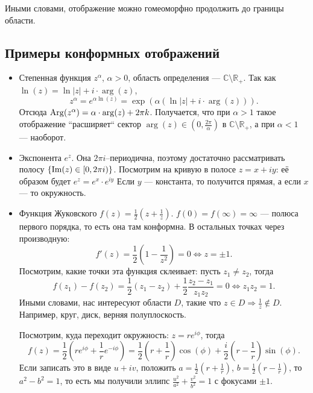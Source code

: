 Иными словами, отображение можно гомеоморфно продолжить до границы области.
\subsection{Примеры конформных отображений}
\begin{itemize}
    \item Степенная функция $z^{\alpha}$, $\alpha > 0$, область определения --- $\mathbb C \setminus \mathbb R_+$.
        Так как $\ln(z) = \ln|z| + i \cdot \arg(z)$,
        \[
            z^\alpha = e^{\alpha \ln(z)} = \exp(\alpha(\ln|z| + i \cdot \arg(z))).
        \]
        Отсюда $\operatorname{Arg}(z^\alpha) = \alpha \cdot \arg(z) + 2\pi k$.
        Получается, что при $\alpha > 1$ такое отображение ``расширяет`` сектор $\arg(z) \in (0, \frac{2\pi}{\alpha})$ в $\mathbb C \setminus \mathbb R_+$, а при $\alpha < 1$ --- наоборот.

    \item Экспонента $e^z$.
        Она $2\pi i$--периодична, поэтому достаточно рассматривать полосу $\{\operatorname{Im}(z) \in [0, 2\pi i)\}$.
        Посмотрим на кривую в полосе $z = x + iy$: её образом будет $e^z = e^x \cdot e^{iy}$
        Если $y$ --- константа, то получится прямая, а если $x$ --- то окружность.

    \item Функция Жуковского $f(z) = \frac{1}{2} \left(z + \frac{1}{z} \right)$.
        $f(0) = f(\infty) = \infty$ --- полюса первого порядка, то есть она там конформна.
        В остальных точках через производную:
        \[
            f'(z) = \frac{1}{2} \left(1 - \frac{1}{z^2} \right) = 0 \iff z = \pm 1.
        \]
        Посмотрим, какие точки эта функция склеивает: пусть $z_1 \ne z_2$, тогда
        \[
            f(z_1) - f(z_2) = \frac{1}{2}(z_1 - z_2) + \frac{1}{2} \frac{z_2 - z_1}{z_1 z_2} = 0 \iff z_1 z_2 = 1.
        \]
        Иными словами, нас интересуют области $D$, такие что $z \in D \Rightarrow \frac{1}{z} \not\in D$.
        Например, круг, диск, верняя полуплоскость.

        Посмотрим, куда переходит окружность: $z = r e^{i\phi}$, тогда
        \[
            f(z) = \frac{1}{2} \left(r e^{i\phi} + \frac{1}{r} e^{-i\phi} \right) = \frac{1}{2} \left(r + \frac{1}{r} \right) \cos(\phi) + \frac{i}{2} \left(r - \frac{1}{r} \right) \sin(\phi).
        \]
        Если записать это в виде $u + iv$, положить $a = \frac{1}{2} \left(r + \frac{1}{r} \right)$, $b = \frac{1}{2} \left(r - \frac{1}{r} \right)$, то $a^2 - b^2 = 1$, то есть мы получили эллипс $\frac{u^2}{a^2} + \frac{v^2}{b^2} = 1$ с фокусами $\pm 1$.


\end{itemize}

